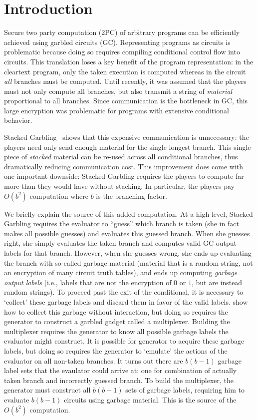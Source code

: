 \section{Introduction}\label{sec:intro}

Secure two party computation (2PC) of arbitrary programs can be
efficiently achieved using garbled circuits (GC).
%
Representing programs as circuits is problematic because doing so
requires compiling conditional control flow into circuits.
This translation loses a key benefit of the program representation:
in the cleartext program, only the taken execution is computed whereas in
the circuit \emph{all} branches must be computed.
%
Until recently, it was assumed that the players must not only compute
all branches, but also transmit a string of \emph{material}
proportional to all branches.
Since communication is the bottleneck in GC, this large encryption was
problematic for programs with extensive conditional behavior.

Stacked Garbling~\cite{EPRINT:HeaKol20b} shows that
this expensive communication is unnecessary: the players need only
send enough material for the single longest branch. This single
piece of \emph{stacked} material can be re-used across all conditional branches, thus
dramatically reducing communication cost.
%
This improvement does come with one important downside:
Stacked Garbling requires the players to compute far more than they
would have without stacking.
In particular, the players pay $O(b^2)$ computation where $b$ is the
branching factor.

We briefly explain the source of this added computation.
At a high level, Stacked Garbling requires the evaluator to
``guess'' which branch is taken (she in fact makes all possible
guesses) and evaluates this guessed branch.
When she guesses right, she simply evaluates the taken branch and
computes valid GC output labels for that branch.
However, when she guesses wrong, she ends up evaluating the branch
with so-called garbage material (material that is a random string, not
an encryption of many circuit truth tables), and ends up computing
\emph{garbage output labels} (i.e., labels that are not the encryption
of $0$ or $1$, but are instead random strings).
%
To proceed past the exit of the conditional, it is necessary to
`collect' these garbage labels and discard them in favor of the valid
labels.
%
\cite{EPRINT:HeaKol20b} show how to collect this garbage without
interaction, but doing so requires the generator to construct a
garbled gadget called a multiplexer.
Building the multiplexer requires the generator to know all possible
garbage labels the evaluator might construct.
%
It is possible for generator to acquire these garbage labels, but
doing so requires the generator to `emulate' the actions of the
evaluator on all non-taken branches.
It turns out there are $b(b-1)$ garbage label sets that the evaulator
could arrive at: one for combination of actually taken branch and
incorrectly guessed branch.
%
To build the multiplexer, the generator must construct all $b(b-1)$
sets of garbage labels, requiring him to evaluate $b(b-1)$ circuits
using garbage material.
This is the source of the $O(b^2)$ computation.

